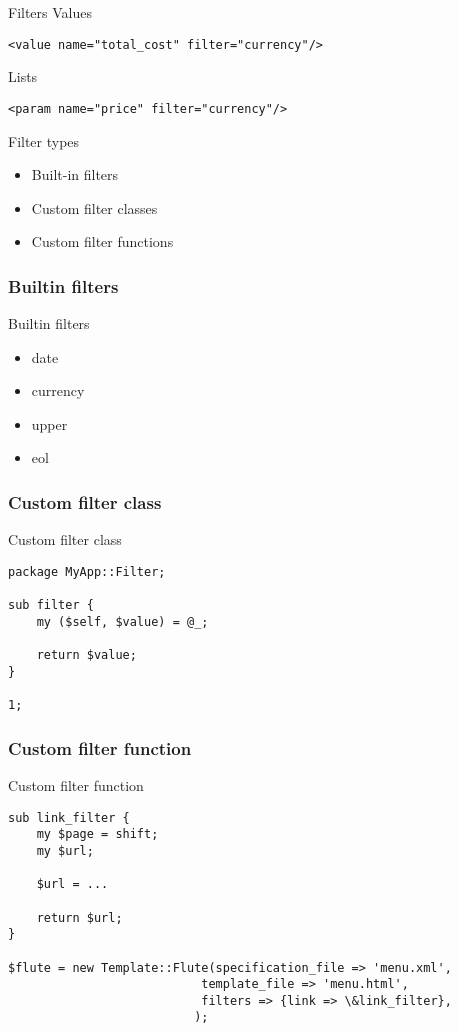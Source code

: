 \begin{frame}[fragile]{Filters}
Values
\begin{lstlisting}
<value name="total_cost" filter="currency"/>
\end{lstlisting}
Lists
\begin{lstlisting}
<param name="price" filter="currency"/>
\end{lstlisting}

\end{frame}

\begin{frame}{Filter types}
\begin{itemize}
\item{Built-in filters}
\item{Custom filter classes}
\item{Custom filter functions}
\end{itemize}
\end{frame}

\subsubsection{Builtin filters}
\begin{frame}{Builtin filters}
\begin{itemize}
\item date
\item currency
\item upper
\item eol
\end{itemize}
\end{frame}

\subsubsection{Custom filter class}
\begin{frame}[fragile]{Custom filter class}
\begin{lstlisting}
package MyApp::Filter;

sub filter {
    my ($self, $value) = @_;

    return $value;
}

1;
\end{lstlisting}
\end{frame}

\subsubsection{Custom filter function}
\begin{frame}[fragile]{Custom filter function}
\begin{lstlisting}
sub link_filter {
    my $page = shift;
    my $url;

    $url = ...
    
    return $url;
}

$flute = new Template::Flute(specification_file => 'menu.xml',
						   template_file => 'menu.html',
						   filters => {link => \&link_filter},
						  );
\end{lstlisting}
\end{frame}

